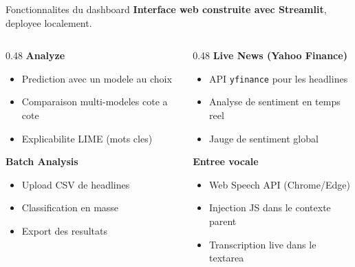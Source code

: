 \documentclass[aspectratio=169, 11pt]{beamer}
\begin{document}
\begin{frame}{Fonctionnalites du dashboard}
  \textbf{Interface web construite avec Streamlit}, deployee localement.
  \vspace{0.3cm}
  \begin{columns}[T]
    \begin{column}{0.48\textwidth}
      \textbf{Analyze}
      \begin{itemize}
        \item Prediction avec un modele au choix
        \item Comparaison multi-modeles cote a cote
        \item Explicabilite LIME (mots cles)
      \end{itemize}
      \vspace{0.2cm}
      \textbf{Batch Analysis}
      \begin{itemize}
        \item Upload CSV de headlines
        \item Classification en masse
        \item Export des resultats
      \end{itemize}
    \end{column}
    \begin{column}{0.48\textwidth}
      \textbf{Live News (Yahoo Finance)}
      \begin{itemize}
        \item API \texttt{yfinance} pour les headlines
        \item Analyse de sentiment en temps reel
        \item Jauge de sentiment global
      \end{itemize}
      \vspace{0.2cm}
      \textbf{Entree vocale}
      \begin{itemize}
        \item Web Speech API (Chrome/Edge)
        \item Injection JS dans le contexte parent
        \item Transcription live dans le textarea
      \end{itemize}
    \end{column}
  \end{columns}
\end{frame}
\end{document}
